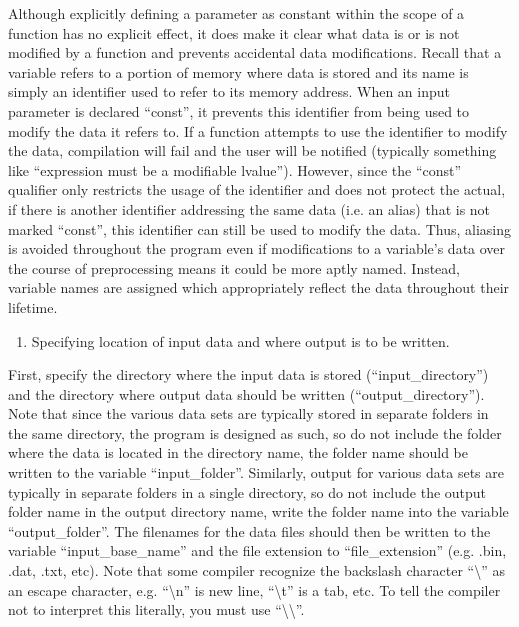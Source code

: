 \documentclass{article}
\begin{document}
Although explicitly defining a parameter as constant within the scope of a function has no explicit effect, it does make it clear what data is or is not modified by a function and prevents accidental data modifications.  Recall that a variable refers to a portion of memory where data is stored and its name is simply an identifier used to refer to its memory address.  When an input parameter is declared ``const'', it prevents this identifier from being used to modify the data it refers to.  If a function attempts to use the identifier to modify the data, compilation will fail and the user will be notified (typically something like ``expression must be a modifiable lvalue'').  However, since the ``const'' qualifier only restricts the usage of the identifier and does not protect the actual, if there is another identifier addressing the same data (i.e. an alias) that is not marked ``const'', this identifier can still be used to modify the data.  Thus, aliasing is avoided throughout the program even if modifications to a variable's data over the course of preprocessing means it could be more aptly named.  Instead, variable names are assigned which appropriately reflect the data throughout their lifetime.
\begin{enumerate}[label = (\arabic*), leftmargin = 0.0cm, resume = section]
\bfseries
\item Specifying location of input data and where output is to be written.
\end{enumerate}
First, specify the directory where the input data is stored (``input\_directory'') and the directory where output data should be written (``output\_directory'').  Note that since the various data sets are typically stored in separate folders in the same directory, the program is designed as such, so do not include the folder where the data is located in the directory name, the folder name should be written to the variable ``input\_folder''.  Similarly, output for various data sets are typically in separate folders in a single directory, so do not include the output folder name in the output directory name, write the folder name into the variable ``output\_folder''.  The filenames for the data files should then be written to the variable ``input\_base\_name'' and the file extension to ``file\_extension'' (e.g. .bin, .dat, .txt, etc).  Note that some compiler recognize the backslash character ``\textbackslash'' as an escape character, e.g. ``\textbackslash n'' is new line, ``\textbackslash t'' is a tab, etc.  To tell the compiler not
to interpret this literally, you must use ``\textbackslash\textbackslash''.
\end{document}
